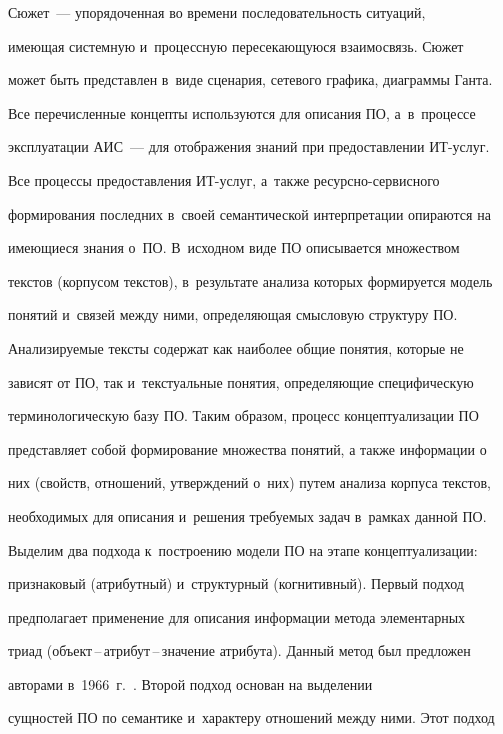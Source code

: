   Сюжет~--- упорядоченная во времени последовательность ситуаций, 


имеющая системную и~процессную пересекающуюся взаимосвязь. Сюжет 


может быть представлен в~виде сценария, сетевого графика, диаграммы Ганта. 


  


  Все перечисленные концепты используются для описания ПО, а~в~процессе 


эксплуатации АИС~--- для отображения знаний при предоставлении ИТ-услуг. 


Все процессы предоставления ИТ-услуг, а~также ре\-сурс\-но-сер\-вис\-но\-го 


формирования последних в~своей семантической интерпретации опираются на 


имеющиеся знания о~ПО. В~исходном виде ПО описывается множеством 


текстов (корпусом текстов), в~результате анализа которых формируется модель 


понятий и~связей между ними, определяющая смысловую структуру ПО. 


Анализируемые тексты содержат как наиболее общие понятия, которые не 


зависят от ПО, так и~текстуальные понятия, определяющие специфическую 


терминологическую базу ПО. Таким образом, процесс концептуализации ПО 


представляет собой формирование множества понятий, а также информации о~


них (свойств, отношений, утверждений о~них) путем анализа корпуса текстов, 


необходимых для описания и~решения требуемых задач в~рамках данной ПО.


  


  Выделим два подхода к~построению модели ПО на этапе концептуализации: 


признаковый (атрибутный) и~структурный (когнитивный). Первый подход 


предполагает применение для описания информации метода элементарных 


триад (объект\,--\,ат\-ри\-бут\,--\,зна\-че\-ние атрибута). Данный метод был предложен 


авторами в~1966~г.~\cite{10-rod}. Второй подход основан на выделении 


сущностей ПО по семантике и~характеру отношений между ними. Этот подход 


